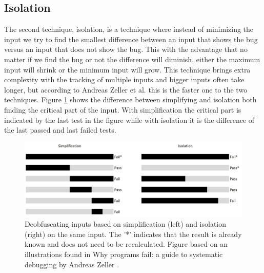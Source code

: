 \subsection{Isolation}
\label{inputReduction:Isolation}
The second technique, isolation, is a technique where instead of minimizing the input we try to find the smallest difference between an input that shows the bug versus an input that does not show the bug. This with the advantage that no matter if we find the bug or not the difference will diminish, either the maximum input will shrink or the minimum input will grow. 
This technique brings extra complexity with the tracking of multiple inputs and bigger inputs often take longer, but according to Andreas Zeller et al. \cite{5zeller2002simplifyingIsolatingFailure-inducing} this is the faster one to the two techniques. 
Figure \ref{fig:simplificationIsolation} shows the difference between simplifying and isolation both finding the critical part of the input. With simplification the critical part is indicated by the last test in the figure while with isolation it is the difference of the last passed and last failed tests.
\begin{figure}
	\centering
	\includegraphics[width=1.0\textwidth]{images/simplificationIsolation}
	\caption{Deobfuscating inputs based on simplification (left) and isolation (right) on the same input. The '*' indicates that the result is already known and does not need to be recalculated. Figure based on an illustrations found in Why programs fail: a guide to systematic debugging by Andreas Zeller \cite{bookZellerwhyProgramsFail}.}
	\label{fig:simplificationIsolation}
\end{figure}

